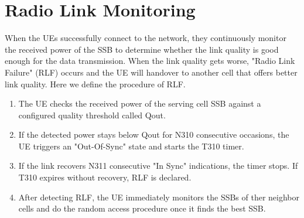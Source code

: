 

\section{Radio Link Monitoring}
When the UEs successfully connect to the network, they continuously monitor the received power of the SSB to determine whether the link quality is good enough for the data transmission. When the link quality gets worse, "Radio Link Failure" (RLF) occurs and the UE will handover to another cell that offers better link quality. Here we define the procedure of RLF. 
\begin{enumerate}
  \item The UE checks the received power of the serving cell SSB against a configured quality threshold called Qout.
  \item If the detected power stays below Qout for N310 consecutive occasions, the UE triggers an "Out-Of-Sync" state and starts the T310 timer.
  \item If the link recovers N311 consecutive "In Sync" indications, the timer stops. If T310 expires without recovery, RLF is declared.
  \item After detecting RLF, the UE immediately monitors the SSBs of ther neighbor cells and do the random access procedure once it finds the best SSB.
\end{enumerate}


